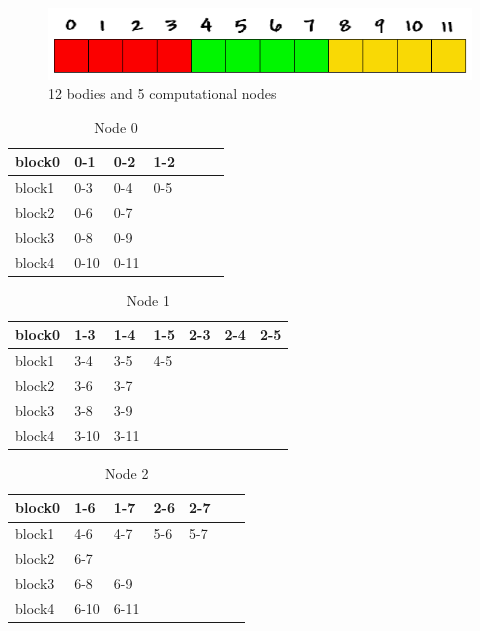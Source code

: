 \documentclass[a4paper]{article}
\begin{document}
\begin{figure}[ht]
  \centering\includegraphics[width=0.6\linewidth]{array_procs_3}
  \caption{12 bodies and 5 computational nodes}
  \label{fig:5nodes}
\end{figure}

\begin{table}[]
\centering
\caption{Node 0}
\label{my-label}
\begin{tabular}{l|llllll}
block0 & 0-1  & 0-2  & 1-2 &  &  &  \\ \hline
block1 & 0-3  & 0-4  & 0-5 &  &  &  \\ \hline
block2 & 0-6  & 0-7  &     &  &  &  \\ \hline
block3 & 0-8  & 0-9  &     &  &  &  \\ \hline
block4 & 0-10 & 0-11 &     &  &  &  
\end{tabular}
\end{table}

\begin{table}[]
\centering
\caption{Node 1}
\label{my-label}
\begin{tabular}{l|llllll}
block0 & 1-3  & 1-4  & 1-5 & 2-3 & 2-4 & 2-5  \\ \hline
block1 & 3-4  & 3-5  & 4-5 &     &     &      \\ \hline
block2 & 3-6  & 3-7  &     &     &     &      \\ \hline
block3 & 3-8  & 3-9  &     &     &     &      \\ \hline
block4 & 3-10 & 3-11 &     &     &     &      
\end{tabular}
\end{table}

\begin{table}[]
\centering
\caption{Node 2}
\label{my-label}
\begin{tabular}{l|llllll}
block0 & 1-6  & 1-7  & 2-6 & 2-7 &  &  \\ \hline
block1 & 4-6  & 4-7  & 5-6 & 5-7 &  &  \\ \hline
block2 & 6-7  &      &     &     &  &  \\ \hline
block3 & 6-8  & 6-9  &     &     &  &  \\ \hline
block4 & 6-10 & 6-11 &     &     &  & 
\end{tabular}
\end{table}
\end{document}
